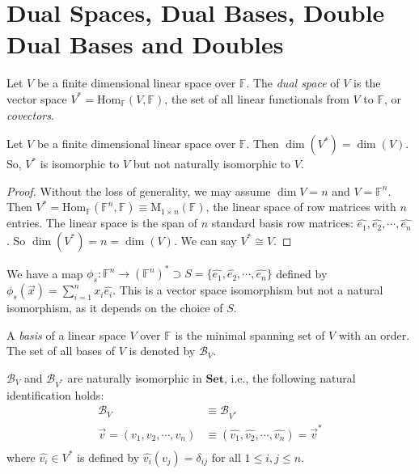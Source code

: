 \documentclass[
	11pt, %
	fleqn, %
	a4paper, %
]{LegrandOrangeBook}
\newcommand{\Hom}{\text{Hom}} %
\newcommand{\F}{\mathbb{F}} %
\newcommand{\M}[2]{\text{M}_{#1}(#2)} %
\newcommand{\Set}{\textbf{Set}} %
\newcommand{\B}{\mathcal{B}} %
\begin{document}
\newpage

\section{Dual Spaces, Dual Bases, Double Dual Bases and Doubles}

Let $V$ be a finite dimensional linear space over $\F$. The \emph{dual space} of $V$ is the vector space $V^* = \Hom_{\F}(V, \F)$, the set of all linear functionals from $V$ to $\F$, or \emph{covectors}. 

\begin{proposition}
    Let $V$ be a finite dimensional linear space over $\F$. Then $\dim(V^*) = \dim(V)$. So, $V^*$ is isomorphic to $V$ but not naturally isomorphic to $V$.
\end{proposition}
\begin{proof}
    Without the loss of generality, we may assume $\dim{V} = n$ and $V = \F^n$. Then $V^* = \Hom_{\F}(\F^n, \F) \equiv \M{1 \times n}{\F}$, the linear space of row matrices with $n$ entries. The linear space is the span of $n$ standard basis row matrices: $\hat{e_1}, \hat{e_2}, \cdots, \hat{e_n}$. So $\dim(V^*) = n = \dim(V)$. We can say $V^* \cong V$.
\end{proof}

We have a map $\phi_s : \F^n \to (\F^n)^* \supset S = \{\hat{e_1}, \hat{e_2}, \cdots, \hat{e_n}\}$ defined by $\phi_s(\vec{x}) = \sum_{i=1}^n x_i \hat{e_i}$. This is a vector space isomorphism but not a natural isomorphism, as it depends on the choice of $S$.

\begin{definition}[Bases]
    A \emph{basis} of a linear space $V$ over $\F$ is the minimal spanning set of $V$ with an order. The set of all bases of $V$ is denoted by $\B_V$.
\end{definition}

\begin{proposition}
    $\B_V$ and $\B_{V^*}$ are naturally isomorphic in $\Set$, i.e., the following natural identification holds:
    \[
        \begin{split}
            \B_V &\equiv \B_{V^*} \\
            \vec{v} = (v_1, v_2, \cdots, v_n) &\equiv (\hat{v_1}, \hat{v_2}, \cdots, \hat{v_n}) = \vec{v}^* \\
        \end{split}
    \]
    where $\hat{v_i} \in V^*$ is defined by $\hat{v_i}(v_j) = \delta_{ij}$ for all $1 \leq i, j \leq n$.
\end{proposition}
\end{document}
